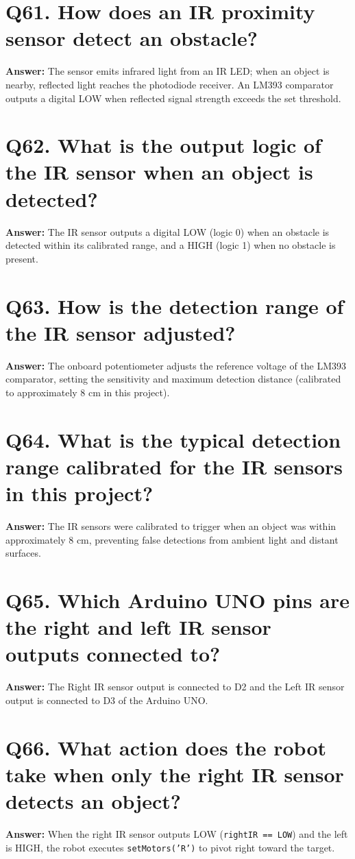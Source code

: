 \documentclass[12pt,a4paper,oneside]{report}
\begin{document}
\section{Q61. How does an IR proximity sensor detect an obstacle?}
\textbf{Answer:} The sensor emits infrared light from an IR LED; when an object is nearby, reflected light reaches the photodiode receiver. An LM393 comparator outputs a digital LOW when reflected signal strength exceeds the set threshold.

\section{Q62. What is the output logic of the IR sensor when an object is detected?}
\textbf{Answer:} The IR sensor outputs a digital LOW (logic 0) when an obstacle is detected within its calibrated range, and a HIGH (logic 1) when no obstacle is present.

\section{Q63. How is the detection range of the IR sensor adjusted?}
\textbf{Answer:} The onboard potentiometer adjusts the reference voltage of the LM393 comparator, setting the sensitivity and maximum detection distance (calibrated to approximately 8 cm in this project).

\section{Q64. What is the typical detection range calibrated for the IR sensors in this project?}
\textbf{Answer:} The IR sensors were calibrated to trigger when an object was within approximately 8 cm, preventing false detections from ambient light and distant surfaces.

\section{Q65. Which Arduino UNO pins are the right and left IR sensor outputs connected to?}
\textbf{Answer:} The Right IR sensor output is connected to D2 and the Left IR sensor output is connected to D3 of the Arduino UNO.

\section{Q66. What action does the robot take when only the right IR sensor detects an object?}
\textbf{Answer:} When the right IR sensor outputs LOW (\texttt{rightIR == LOW}) and the left is HIGH, the robot executes \texttt{setMotors('R')} to pivot right toward the target.
\end{document}
